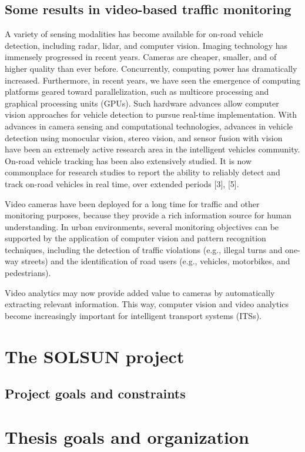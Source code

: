\subsection{Some results in video-based traffic monitoring}
A variety of sensing modalities has become available for
on-road vehicle detection, including radar, lidar, and computer
vision. Imaging technology has immensely progressed
in recent years. Cameras are cheaper, smaller, and of higher
quality than ever before. Concurrently, computing power has
dramatically increased. Furthermore, in recent years, we have
seen the emergence of computing platforms geared toward
parallelization, such as multicore processing and graphical processing
units (GPUs). Such hardware advances allow computer
vision approaches for vehicle detection to pursue real-time
implementation.
With advances in camera sensing and computational technologies,
advances in vehicle detection using monocular vision,
stereo vision, and sensor fusion with vision have been
an extremely active research area in the intelligent vehicles
community. On-road vehicle tracking has been also extensively
studied. It is now commonplace for research studies to report
the ability to reliably detect and track on-road vehicles in real
time, over extended periods [3], [5].

Video cameras have been deployed for a long
time for traffic and other monitoring purposes, because they
provide a rich information source for human understanding.
In urban environments, several monitoring objectives can
be supported by the application of computer vision and pattern
recognition techniques, including the detection of traffic
violations (e.g., illegal turns and one-way streets) and the
identification of road users (e.g., vehicles, motorbikes, and
pedestrians).

Video analytics may now provide added value to cameras by automatically
extracting relevant information. This way, computer
vision and video analytics become increasingly important for
intelligent transport systems (ITSs).
\section{The SOLSUN project}
\subsection{Project goals and constraints}

\section{Thesis goals and organization}
